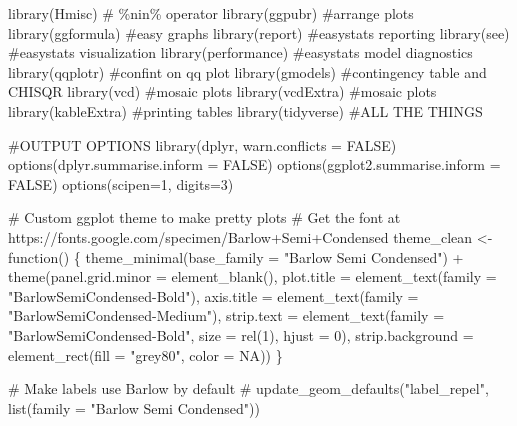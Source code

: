 \documentclass[
  letterpaper,
  DIV=11,
  numbers=noendperiod]{scrreprt}
\newenvironment{Shaded}{\begin{snugshade}}{\end{snugshade}}
\newcommand{\AttributeTok}[1]{\textcolor[rgb]{0.40,0.45,0.13}{#1}}
\newcommand{\CommentTok}[1]{\textcolor[rgb]{0.37,0.37,0.37}{#1}}
\newcommand{\ConstantTok}[1]{\textcolor[rgb]{0.56,0.35,0.01}{#1}}
\newcommand{\ControlFlowTok}[1]{\textcolor[rgb]{0.00,0.23,0.31}{#1}}
\newcommand{\DecValTok}[1]{\textcolor[rgb]{0.68,0.00,0.00}{#1}}
\newcommand{\FunctionTok}[1]{\textcolor[rgb]{0.28,0.35,0.67}{#1}}
\newcommand{\NormalTok}[1]{\textcolor[rgb]{0.00,0.23,0.31}{#1}}
\newcommand{\OtherTok}[1]{\textcolor[rgb]{0.00,0.23,0.31}{#1}}
\newcommand{\SpecialCharTok}[1]{\textcolor[rgb]{0.37,0.37,0.37}{#1}}
\newcommand{\StringTok}[1]{\textcolor[rgb]{0.13,0.47,0.30}{#1}}
\begin{document}
\begin{Shaded}
\begin{Highlighting}[]
\FunctionTok{library}\NormalTok{(Hmisc) }\CommentTok{\# \%nin\% operator}
\FunctionTok{library}\NormalTok{(ggpubr) }\CommentTok{\#arrange plots}
\FunctionTok{library}\NormalTok{(ggformula) }\CommentTok{\#easy graphs}
\FunctionTok{library}\NormalTok{(report) }\CommentTok{\#easystats reporting}
\FunctionTok{library}\NormalTok{(see) }\CommentTok{\#easystats visualization}
\FunctionTok{library}\NormalTok{(performance) }\CommentTok{\#easystats model diagnostics}
\FunctionTok{library}\NormalTok{(qqplotr) }\CommentTok{\#confint on qq plot}
\FunctionTok{library}\NormalTok{(gmodels) }\CommentTok{\#contingency table and CHISQR}
\FunctionTok{library}\NormalTok{(vcd) }\CommentTok{\#mosaic plots}
\FunctionTok{library}\NormalTok{(vcdExtra) }\CommentTok{\#mosaic plots}
\FunctionTok{library}\NormalTok{(kableExtra) }\CommentTok{\#printing tables }
\FunctionTok{library}\NormalTok{(tidyverse) }\CommentTok{\#ALL THE THINGS}


\CommentTok{\#OUTPUT OPTIONS}
\FunctionTok{library}\NormalTok{(dplyr, }\AttributeTok{warn.conflicts =} \ConstantTok{FALSE}\NormalTok{)}
\FunctionTok{options}\NormalTok{(}\AttributeTok{dplyr.summarise.inform =} \ConstantTok{FALSE}\NormalTok{)}
\FunctionTok{options}\NormalTok{(}\AttributeTok{ggplot2.summarise.inform =} \ConstantTok{FALSE}\NormalTok{)}
\FunctionTok{options}\NormalTok{(}\AttributeTok{scipen=}\DecValTok{1}\NormalTok{, }\AttributeTok{digits=}\DecValTok{3}\NormalTok{)}

\CommentTok{\# Custom ggplot theme to make pretty plots}
\CommentTok{\# Get the font at https://fonts.google.com/specimen/Barlow+Semi+Condensed}
\NormalTok{theme\_clean }\OtherTok{\textless{}{-}} \ControlFlowTok{function}\NormalTok{() \{}
  \FunctionTok{theme\_minimal}\NormalTok{(}\AttributeTok{base\_family =} \StringTok{"Barlow Semi Condensed"}\NormalTok{) }\SpecialCharTok{+}
    \FunctionTok{theme}\NormalTok{(}\AttributeTok{panel.grid.minor =} \FunctionTok{element\_blank}\NormalTok{(),}
          \AttributeTok{plot.title =} \FunctionTok{element\_text}\NormalTok{(}\AttributeTok{family =} \StringTok{"BarlowSemiCondensed{-}Bold"}\NormalTok{),}
          \AttributeTok{axis.title =} \FunctionTok{element\_text}\NormalTok{(}\AttributeTok{family =} \StringTok{"BarlowSemiCondensed{-}Medium"}\NormalTok{),}
          \AttributeTok{strip.text =} \FunctionTok{element\_text}\NormalTok{(}\AttributeTok{family =} \StringTok{"BarlowSemiCondensed{-}Bold"}\NormalTok{,}
                                    \AttributeTok{size =} \FunctionTok{rel}\NormalTok{(}\DecValTok{1}\NormalTok{), }\AttributeTok{hjust =} \DecValTok{0}\NormalTok{),}
          \AttributeTok{strip.background =} \FunctionTok{element\_rect}\NormalTok{(}\AttributeTok{fill =} \StringTok{"grey80"}\NormalTok{, }\AttributeTok{color =} \ConstantTok{NA}\NormalTok{))}
\NormalTok{\}}

\CommentTok{\# Make labels use Barlow by default}
\CommentTok{\# update\_geom\_defaults("label\_repel", list(family = "Barlow Semi Condensed"))}
\end{Highlighting}
\end{Shaded}
\end{document}

